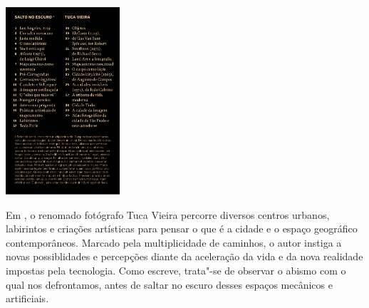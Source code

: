 \pagebreak

\hspace{.5cm}

\begin{center}
\hspace*{-.5cm}\includegraphics[width=42.4mm]{./imgs/escuro.png}
\end{center}

\hspace*{-7cm}\hrulefill\hspace*{-7cm}



\medskip

\noindent{}Em {}, o renomado fotógrafo Tuca Vieira percorre diversos centros urbanos, labirintos e criações artísticas para pensar o que é a cidade e o espaço geográfico contemporâneos. Marcado pela multiplicidade de caminhos, o autor instiga a novas possiblidades e percepções diante da aceleração da vida e da nova realidade impostas pela tecnologia. Como escreve, trata"-se de observar o abismo com o qual nos defrontamos, antes de saltar no escuro desses espaços mecânicos e artificiais.

\vfill

\hspace*{-.4cm}\begin{minipage}[c]{1\linewidth}
\small{
{}}
\end{minipage}

\pagebreak
